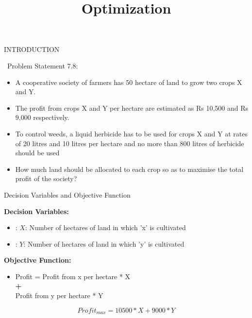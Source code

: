 \documentclass{beamer}
\title{ Optimization}
\institute{ \large GOUTHAM A.G.V  \and EE17BTECH11001   }
\begin{document}
\maketitle

\begin{frame}{INTRODUCTION
}


\ Problem Statement 7.8:
\begin{itemize}
\item A cooperative society
of farmers has 50 hectare of land to grow two
crops X and Y.  
\item   The profit from crops X and Y
per hectare are estimated as Rs 10,500 and Rs
9,000 respectively.
\item  To control weeds, a liquid
herbicide has to be used for crops X and Y
at rates of 20 litres and 10 litres per hectare and no more than 800 litres of herbicide
should be used
\item  How much land should be
allocated to each crop so as to maximise the
total profit of the society?

\end{itemize}
\end{frame}

\begin{frame}{Decision Variables and Objective Function}

\textbf{Decision Variables:}
\vspace{0.4cm}
\begin{itemize}
\item : $X$: Number of hectares of land in which 'x' is cultivated
\item : $Y$: Number of hectares of land in which 'y' is cultivated
\vspace{0.8cm}
\end{itemize}
\textbf{Objective Function:}\\
\vspace{0.2cm}
\begin{itemize}
\item Profit = 
\hspace{0.15cm}Profit from x per hectare * X\\
\hspace{3.3cm} \textbf{+}\\
\hspace{1.6cm} Profit from y per hectare * Y\\
\end{itemize}
\vspace{0.5cm}
\Large
$$Profit_{max} = 10500 * X + 9000 * Y$$

\end{frame}
\end{document}
